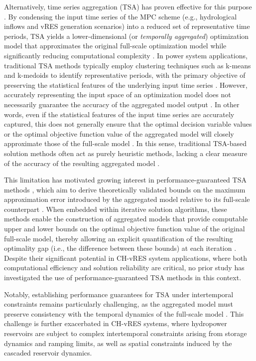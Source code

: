 \documentclass[a4paper,fleqn]{cas-sc}
\begin{document}
Alternatively, time series aggregation (TSA) has proven effective for this purpose \citep{hoffmann2020review}.
By condensing the input time series of the MPC scheme (e.g., hydrological inflows and vRES generation scenarios) into a reduced set of representative time periods,
TSA yields a lower-dimensional (or \textit{temporally aggregated}) optimization model that approximates the original full-scale optimization model while significantly reducing computational complexity \citep{tejada2018enhanced}.
In power system applications, traditional TSA methods typically employ clustering techniques such as k-means \citep{liu2017hierarchical} and k-medoids \citep{schutz2018comparison} to identify representative periods,
with the primary objective of preserving the statistical features of the underlying input time series \citep{sarajpoor2023time}.
However, accurately representing the input space of an optimization model does not necessarily guarantee the accuracy of the aggregated model output \citep{wogrin2023time}.
In other words, even if the statistical features of the input time series are accurately captured, this does not generally ensure that the optimal decision variable values or the optimal objective function value of the aggregated model will closely approximate those of the full-scale model \citep{zhang2022model}.
In this sense, traditional TSA-based solution methods often act as purely heuristic methods, lacking a clear measure of the accuracy of the resulting aggregated model \citep{teichgraeber2022time}.

This limitation has motivated growing interest in performance-guaranteed TSA methods \citep{santosuosso2025we},
which aim to derive theoretically validated bounds on the maximum approximation error introduced by the aggregated model relative to its full-scale counterpart \citep{li2022representative}.
When embedded within iterative solution algorithms, these methods enable the construction of aggregated models that provide computable upper and lower bounds on the optimal objective function value of the original full-scale model, thereby allowing an explicit quantification of the resulting optimality gap (i.e., the difference between these bounds) at each iteration \citep{santosuosso2025optimal}.
Despite their significant potential in CH-vRES system applications, where both computational efficiency and solution reliability are critical, no prior study has investigated the use of performance-guaranteed TSA methods in this context.

Notably, establishing performance guarantees for TSA under intertemporal constraints remains particularly challenging, as the aggregated model must preserve consistency with the temporal dynamics of the full-scale model \citep{pineda2018chronological}.
This challenge is further exacerbated in CH-vRES systems, where hydropower reservoirs are subject to complex intertemporal constraints arising from storage dynamics and ramping limits, as well as spatial constraints induced by the cascaded reservoir dynamics.
\end{document}
